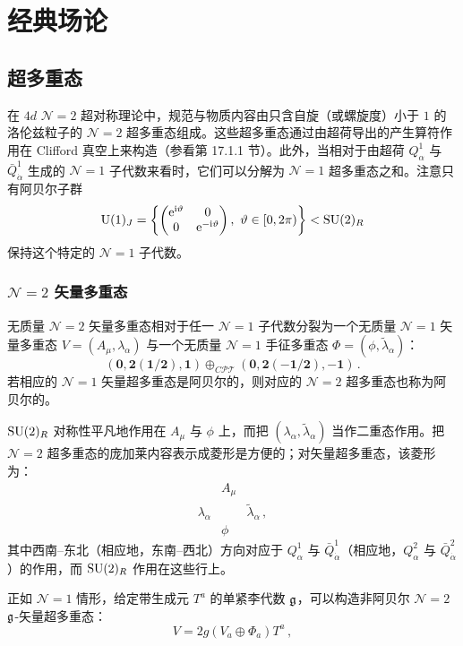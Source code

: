\section{经典场论}

\subsection{超多重态}

在 $4d$ $\mathcal N=2$ 超对称理论中，规范与物质内容由只含自旋（或螺旋度）小于 $1$ 的洛伦兹粒子的 $\mathcal N=2$ 超多重态组成。这些超多重态通过由超荷导出的产生算符作用在 Clifford 真空上来构造（参看第 17.1.1 节）。此外，当相对于由超荷 $Q^1_\alpha$ 与 $\bar Q^1_{\dot\alpha}$ 生成的 $\mathcal N=1$ 子代数来看时，它们可以分解为 $\mathcal N=1$ 超多重态之和。注意只有阿贝尔子群
\[
\U(1)_J=\left\{\begin{pmatrix} \ee^{\ii\vartheta} & 0\\ 0 & \ee^{-\ii\vartheta}\end{pmatrix},\ \vartheta\in[0,2\pi)\right\}<\SU(2)_R
\]
保持这个特定的 $\mathcal N=1$ 子代数。

\subsubsection*{$\mathcal N=2$ 矢量多重态}

无质量 $\mathcal N=2$ 矢量多重态相对于任一 $\mathcal N=1$ 子代数分裂为一个无质量 $\mathcal N=1$ 矢量多重态 $V=(A_\mu,\lambda_\alpha)$ 与一个无质量 $\mathcal N=1$ 手征多重态 $\Phi=(\phi,\tilde\lambda_\alpha)$：
\[
(\mathbf{0},\mathbf{2}(\mathbf{1/2}),\mathbf{1})\oplus_{C\mathcal{PT}}(\mathbf{0},\mathbf{2}(\mathbf{-1/2}),-\mathbf{1})\,.
\]
若相应的 $\mathcal N=1$ 矢量超多重态是阿贝尔的，则对应的 $\mathcal N=2$ 超多重态也称为阿贝尔的。

$\operatorname{SU}(2)_R$ 对称性平凡地作用在 $A_\mu$ 与 $\phi$ 上，而把 $(\lambda_\alpha,\tilde\lambda_\alpha)$ 当作二重态作用。把 $\mathcal N=2$ 超多重态的庞加莱内容表示成菱形是方便的；对矢量超多重态，该菱形为：
\[
\begin{matrix}
& A_\mu &\\[2pt]
\lambda_\alpha & & \tilde\lambda_\alpha\,,\\[2pt]
& \phi &
\end{matrix}
\]
其中西南–东北（相应地，东南–西北）方向对应于 $Q^1_\alpha$ 与 $\bar Q^1_{\dot\alpha}$（相应地，$Q^2_\alpha$ 与 $\bar Q^2_{\dot\alpha}$）的作用，而 $\operatorname{SU}(2)_R$ 作用在这些行上。

正如 $\mathcal N=1$ 情形，给定带生成元 $T^a$ 的单紧李代数 $\mathfrak{g}$，可以构造非阿贝尔 $\mathcal N=2$ $\mathfrak{g}$-矢量超多重态：
\[
V=2g(V_a\oplus\Phi_a)T^a\,,
\]

